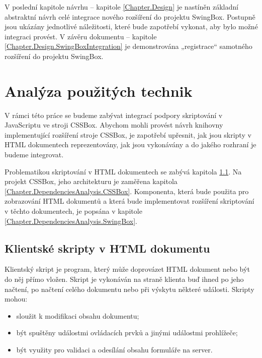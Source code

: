 V poslední kapitole návrhu -- kapitole \ref{Chapter.Design} je nastíněn základní abstraktní návrh celé integrace nového rozšíření do projektu SwingBox. Postupně jsou ukázány jednotlivé náležitosti, které bude zapotřebí vykonat, aby bylo možné integraci provést. V závěru \linebreak[4]dokumentu -- kapitole \ref{Chapter.Design.SwingBoxIntegration} je demonstrována „registrace“ samotného rozšíření do projektu SwingBox.


\chapter{Analýza použitých technik}
\label{Chapter.DependenciesAnalysis}

V rámci této práce se budeme zabývat integrací podpory skriptování v JavaScriptu ve stroji CSSBox. Abychom mohli provést návrh knihovny implementující rozšíření stroje CSSBox, je zapotřebí upřesnit, jak jsou skripty v HTML dokumentech reprezentovány, jak jsou vykonávány a do jakého rozhraní je budeme integrovat.

Problematikou skriptování v HTML dokumentech se zabývá kapitola \ref{Chapter.DependenciesAnalysis.ScriptsInHTML}. Na projekt CSSBox, jeho architekturu je zaměřena kapitola \ref{Chapter.DependenciesAnalysis.CSSBox}. Komponenta, která bude použita pro zobrazování HTML dokumentů a která bude implementovat rozšíření skriptování v těchto dokumentech, je popsána v kapitole \ref{Chapter.DependenciesAnalysis.SwingBox}. 

\section{Klientské skripty v HTML dokumentu}
\label{Chapter.DependenciesAnalysis.ScriptsInHTML}

Klientský skript je program, který může doprovázet HTML dokument nebo být do něj přímo vložen. Skript je vykonáván na straně klienta buď ihned po jeho načtení, po načtení celého dokumentu nebo při výskytu některé události. Skripty mohou:

\begin{itemize}
  \item sloužit k modifikaci obsahu dokumentu;
  \item být spuštěny událostmi ovládacích prvků a jinými událostmi prohlížeče;
  \item být využity pro validaci a odesílání obsahu formuláře na server.
\end{itemize}

